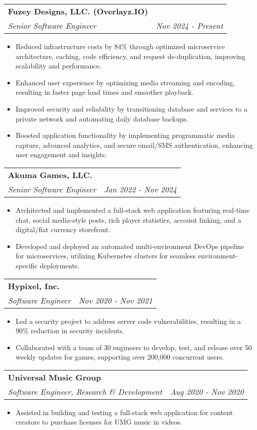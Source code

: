 \documentclass[letterpaper,11pt]{article}
\makeatletter
\newcommand{\resumeSubheading}[4]{
  \vspace{-1pt}\item
    \begin{tabular*}{0.97\textwidth}{l@{\extracolsep{\fill}}r}
      \textbf{#1} & #2 \\
      \textit{\small#3} & \textit{\small #4} \\
    \end{tabular*}\vspace{-5pt}
}
\newcommand{\resumeItemListStart}{\begin{itemize}}
\newcommand{\resumeItemListEnd}{\end{itemize}\vspace{-5pt}}
\makeatother
\begin{document}
    \resumeSubheading
      {Fuzey Designs, LLC. (Overlayz.IO)}{}
      {Senior Software Engineer}{Nov 2024 - Present}
      \resumeItemListStart
        \item
          {Reduced infrastructure costs by 84\% through optimized microservice architecture, caching, code efficiency, and request de-duplication, improving scalability and performance.}
        \item 
          {Enhanced user experience by optimizing media streaming and encoding, resulting in faster page load times and smoother playback.}
        \item
          {Improved security and reliability by transitioning database and services to a private network and automating daily database backups.}
        \item
          {Boosted application functionality by implementing programmatic media capture, advanced analytics, and secure email/SMS authentication, enhancing user engagement and insights.}
      \resumeItemListEnd
    
    \resumeSubheading
      {Akuma Games, LLC.}{}
      {Senior Software Engineer}{Jan 2022 - Nov 2024}
      \resumeItemListStart
        \item
          {Architected and implemented a full-stack web application featuring real-time chat, social media-style posts, rich player statistics, account linking, and a digital/fiat currency storefront.}
        \item 
          {Developed and deployed an automated multi-environment DevOps pipeline for microservices, utilizing Kubernetes clusters for seamless environment-specific deployments.}
      \resumeItemListEnd

    \resumeSubheading
      {Hypixel, Inc.}{}
      {Software Engineer}{Nov 2020 - Nov 2021}
      \resumeItemListStart
        \item
          {Led a security project to address server code vulnerabilities, resulting in a 90\% reduction in security incidents.}
        \item
          {Collaborated with a team of 30 engineers to develop, test, and release over 50 weekly updates for games, supporting over 200,000 concurrent users.}
      \resumeItemListEnd
      
    \resumeSubheading
      {Universal Music Group}{}
      {Software Engineer, Research \& Development}{Aug 2020 - Nov 2020}
      \resumeItemListStart
        \item
          {Assisted in building and testing a full-stack web application for content creators to purchase licenses for UMG music in videos.}
      \resumeItemListEnd
    
\end{document}

